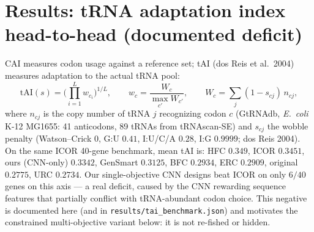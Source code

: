 \section{Results: tRNA adaptation index head-to-head (documented deficit)}
CAI measures codon usage against a reference set; tAI (dos Reis et al.\ 2004) measures adaptation to the actual tRNA pool:
\begin{equation}
\mathrm{tAI}(s)=\Big(\prod_{i=1}^{L} w_{c_i}\Big)^{1/L},\qquad
w_{c}=\frac{W_c}{\max_{c'}W_{c'}},\qquad
W_c=\sum_{j}(1-s_{cj})\,n_{cj},
\end{equation}
where $n_{cj}$ is the copy number of tRNA $j$ recognizing codon $c$ (GtRNAdb, \emph{E.~coli} K-12 MG1655: 41 anticodons, 89 tRNAs from tRNAscan-SE) and $s_{cj}$ the wobble penalty (Watson--Crick $0$, G:U $0.41$, I:U/C/A $0.28$, I:G $0.9999$; dos Reis 2004).
On the same ICOR 40-gene benchmark, mean tAI is: HFC $0.349$, ICOR $0.3451$, ours (CNN-only) $0.3342$, GenSmart $0.3125$, BFC $0.2934$, ERC $0.2909$, original $0.2775$, URC $0.2734$. Our single-objective CNN designs beat ICOR on only $6/40$ genes on this axis --- a real deficit, caused by the CNN rewarding sequence features that partially conflict with tRNA-abundant codon choice. This negative is documented here (and in \texttt{results/tai\_benchmark.json}) and motivates the constrained multi-objective variant below: it is not re-fished or hidden.

